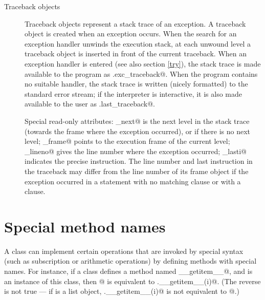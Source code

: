 \begin{description}
\begin{description}
\item[Traceback objects] \label{traceback}
Traceback objects represent a stack trace of an exception.  A
traceback object is created when an exception occurs.  When the search
for an exception handler unwinds the execution stack, at each unwound
level a traceback object is inserted in front of the current
traceback.  When an exception handler is entered
(see also section \ref{try}), the stack trace is
made available to the program as \verb@sys.exc_traceback@.  When the
program contains no suitable handler, the stack trace is written
(nicely formatted) to the standard error stream; if the interpreter is
interactive, it is also made available to the user as
\verb@sys.last_traceback@.

Special read-only attributes: \verb@tb_next@ is the next level in the
stack trace (towards the frame where the exception occurred), or
\verb@None@ if there is no next level; \verb@tb_frame@ points to the
execution frame of the current level; \verb@tb_lineno@ gives the line
number where the exception occurred; \verb@tb_lasti@ indicates the
precise instruction.  The line number and last instruction in the
traceback may differ from the line number of its frame object if the
exception occurred in a \verb@try@ statement with no matching
\verb@except@ clause or with a \verb@finally@ clause.

\end{description} %

\end{description} %


\section{Special method names} \label{specialnames}

A class can implement certain operations that are invoked by special
syntax (such as subscription or arithmetic operations) by defining
methods with special names.  For instance, if a class defines a
method named \verb@__getitem__@, and \verb@x@ is an instance of this
class, then \verb@x[i]@ is equivalent to \verb@x.__getitem__(i)@.
(The reverse is not true --- if \verb@x@ is a list object,
\verb@x.__getitem__(i)@ is not equivalent to \verb@x[i]@.)

